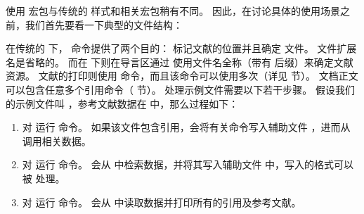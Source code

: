 使用 \biblatex 宏包与传统的 \BibTeX 样式和相关宏包稍有不同。
因此，在讨论具体的使用场景之前，我们首先要看一下典型的文件结构：

%
在传统的 \BibTeX 下， 命令提供了两个目的：
标记文献的位置并且确定  文件。
文件扩展名是省略的。
而在 \biblatex 下则在导言区通过  使用文件名全称（带有  后缀）来确定文献资源。
文献的打印则使用  命令，而且该命令可以使用多次（详见  节）。
文档正文可以包含任意多个引用命令（ 节）。
处理示例文件需要以下若干步骤。
假设我们的示例文件叫 ，参考文献数据在  中，那么过程如下：

\begin{enumerate}

\item %
对  运行  命令。
如果该文件包含引用，\biblatex 会将有关命令写入辅助文件 ，进而从 \biber 调用相关数据。
\item %
对  运行  命令。
\biber 会从  中检索数据，并将其写入辅助文件  中，写入的格式可以被 \biblatex 处理。
\item %
对  运行  命令。
\biblatex 会从  中读取数据并打印所有的引用及参考文献。

\end{enumerate}

